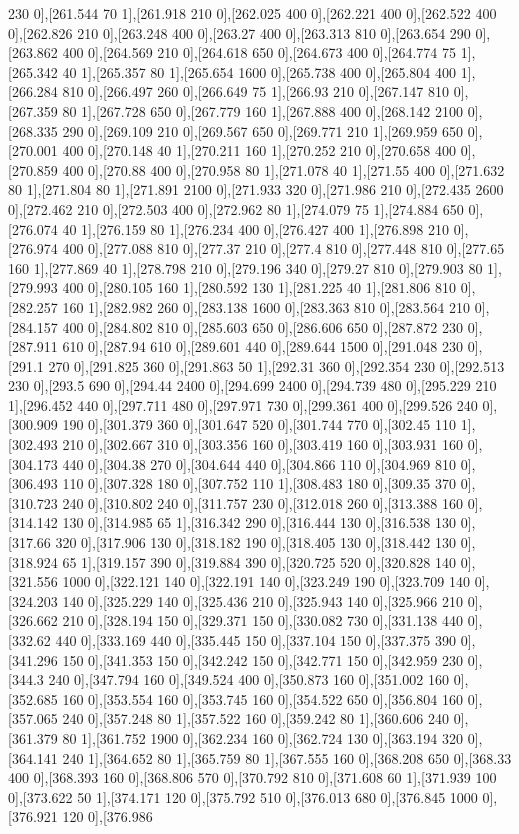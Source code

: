 {230 0],[261.544 70 1],[261.918 210 0],[262.025 400 0],[262.221 400 0],[262.522 400 0],[262.826 210 0],[263.248 400 0],[263.27 400 0],[263.313 810 0],[263.654 290 0],[263.862 400 0],[264.569 210 0],[264.618 650 0],[264.673 400 0],[264.774 75 1],[265.342 40 1],[265.357 80 1],[265.654 1600 0],[265.738 400 0],[265.804 400 1],[266.284 810 0],[266.497 260 0],[266.649 75 1],[266.93 210 0],[267.147 810 0],[267.359 80 1],[267.728 650 0],[267.779 160 1],[267.888 400 0],[268.142 2100 0],[268.335 290 0],[269.109 210 0],[269.567 650 0],[269.771 210 1],[269.959 650 0],[270.001 400 0],[270.148 40 1],[270.211 160 1],[270.252 210 0],[270.658 400 0],[270.859 400 0],[270.88 400 0],[270.958 80 1],[271.078 40 1],[271.55 400 0],[271.632 80 1],[271.804 80 1],[271.891 2100 0],[271.933 320 0],[271.986 210 0],[272.435 2600 0],[272.462 210 0],[272.503 400 0],[272.962 80 1],[274.079 75 1],[274.884 650 0],[276.074 40 1],[276.159 80 1],[276.234 400 0],[276.427 400 1],[276.898 210 0],[276.974 400 0],[277.088 810 0],[277.37 210 0],[277.4 810 0],[277.448 810 0],[277.65 160 1],[277.869 40 1],[278.798 210 0],[279.196 340 0],[279.27 810 0],[279.903 80 1],[279.993 400 0],[280.105 160 1],[280.592 130 1],[281.225 40 1],[281.806 810 0],[282.257 160 1],[282.982 260 0],[283.138 1600 0],[283.363 810 0],[283.564 210 0],[284.157 400 0],[284.802 810 0],[285.603 650 0],[286.606 650 0],[287.872 230 0],[287.911 610 0],[287.94 610 0],[289.601 440 0],[289.644 1500 0],[291.048 230 0],[291.1 270 0],[291.825 360 0],[291.863 50 1],[292.31 360 0],[292.354 230 0],[292.513 230 0],[293.5 690 0],[294.44 2400 0],[294.699 2400 0],[294.739 480 0],[295.229 210 1],[296.452 440 0],[297.711 480 0],[297.971 730 0],[299.361 400 0],[299.526 240 0],[300.909 190 0],[301.379 360 0],[301.647 520 0],[301.744 770 0],[302.45 110 1],[302.493 210 0],[302.667 310 0],[303.356 160 0],[303.419 160 0],[303.931 160 0],[304.173 440 0],[304.38 270 0],[304.644 440 0],[304.866 110 0],[304.969 810 0],[306.493 110 0],[307.328 180 0],[307.752 110 1],[308.483 180 0],[309.35 370 0],[310.723 240 0],[310.802 240 0],[311.757 230 0],[312.018 260 0],[313.388 160 0],[314.142 130 0],[314.985 65 1],[316.342 290 0],[316.444 130 0],[316.538 130 0],[317.66 320 0],[317.906 130 0],[318.182 190 0],[318.405 130 0],[318.442 130 0],[318.924 65 1],[319.157 390 0],[319.884 390 0],[320.725 520 0],[320.828 140 0],[321.556 1000 0],[322.121 140 0],[322.191 140 0],[323.249 190 0],[323.709 140 0],[324.203 140 0],[325.229 140 0],[325.436 210 0],[325.943 140 0],[325.966 210 0],[326.662 210 0],[328.194 150 0],[329.371 150 0],[330.082 730 0],[331.138 440 0],[332.62 440 0],[333.169 440 0],[335.445 150 0],[337.104 150 0],[337.375 390 0],[341.296 150 0],[341.353 150 0],[342.242 150 0],[342.771 150 0],[342.959 230 0],[344.3 240 0],[347.794 160 0],[349.524 400 0],[350.873 160 0],[351.002 160 0],[352.685 160 0],[353.554 160 0],[353.745 160 0],[354.522 650 0],[356.804 160 0],[357.065 240 0],[357.248 80 1],[357.522 160 0],[359.242 80 1],[360.606 240 0],[361.379 80 1],[361.752 1900 0],[362.234 160 0],[362.724 130 0],[363.194 320 0],[364.141 240 1],[364.652 80 1],[365.759 80 1],[367.555 160 0],[368.208 650 0],[368.33 400 0],[368.393 160 0],[368.806 570 0],[370.792 810 0],[371.608 60 1],[371.939 100 0],[373.622 50 1],[374.171 120 0],[375.792 510 0],[376.013 680 0],[376.845 1000 0],[376.921 120 0],[376.986 }
